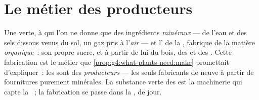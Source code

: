 \section{Le métier des producteurs}

\begin{proposition}\label{prop:g6:plants-are-producers:produce}
Une  verte, à qui l'on ne donne que des ingrédients
\emph{minéraux} --- de l'eau et des sels dissous venus du sol, un
gaz pris à l'\emph{air} --- et l' de la \emph{},
fabrique de la matière \emph{organique}~: son propre sucre, et à
partir de lui du bois, des  et des . Cette
fabrication est le métier que
\cref{prop:g4:what-plants-need:make} promettait d'expliquer~: les
 sont des \emph{producteurs} --- les seuls
fabricants de  neuve à partir de fournitures
purement minérales. La substance verte des  est la
machinerie qui capte la ~; la fabrication se passe dans la
, de jour.
\end{proposition}
\admitted

